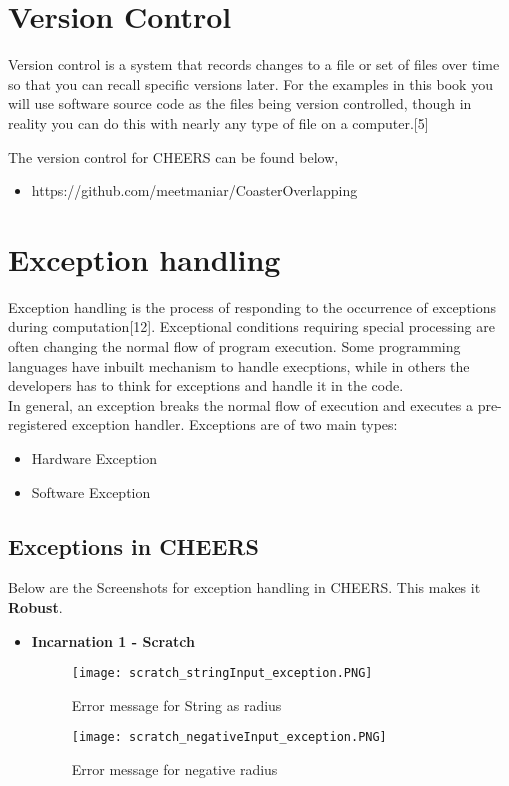 \documentclass[11pt]{article}
\begin{document}
\newpage	
\section{Version Control}
	
		Version control is a system that records changes to a file or set of files over time so that you can recall specific versions later. For the examples in this book you will use software source code as the files being version controlled, though in reality you can do this with nearly any type of file on a computer.[5]
		
		The version control for CHEERS can be found below,
		
		\begin{itemize}
			\item 	https://github.com/meetmaniar/CoasterOverlapping
		\end{itemize}
		
	
	
\section{Exception handling}

		Exception handling is the process of responding to the occurrence of exceptions during computation[12]. Exceptional conditions requiring special processing are often changing the normal flow of program execution. Some programming languages have inbuilt mechanism to handle execptions, while in others the developers has to think for exceptions and handle it in the code.\\
	
		In general, an exception breaks the normal flow of execution and executes a pre-registered exception handler. Exceptions are of two main types:
		
		\begin{itemize}
			\item Hardware Exception
			\item Software Exception
		\end{itemize}
	
	\subsection{Exceptions in CHEERS}	
		Below are the Screenshots for exception handling in CHEERS.  This makes it \textbf{Robust}.
		
		\newpage
		\begin{itemize}
			\item \textbf{Incarnation 1 - Scratch} 
			
			\begin{figure}[h!]
				\texttt{[image: scratch\_stringInput\_exception.PNG]} %
				\caption{Error message for String as radius}
			\end{figure}
			
			\begin{figure}[h!]
				\texttt{[image: scratch\_negativeInput\_exception.PNG]} %
				\caption{Error message for negative radius}
			\end{figure}
		\end{itemize}
		
\end{document}
